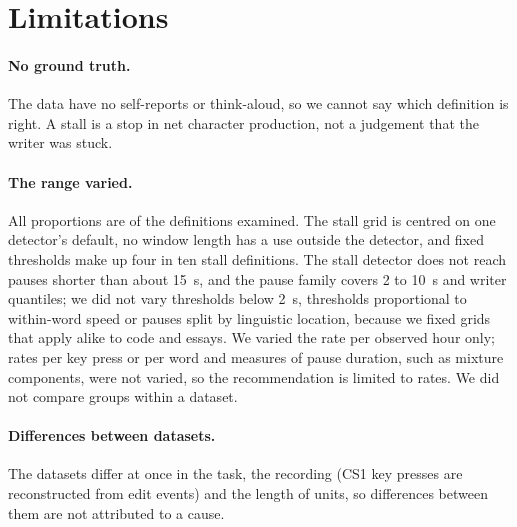 \section{Limitations}
\label{sec:limitations}

\paragraph{No ground truth.} The data have no self-reports or think-aloud, so we cannot say which definition is right.
A stall is a stop in net character production, not a judgement that the writer was stuck.

\paragraph{The range varied.} All proportions are of the definitions examined. The stall grid is centred on one
detector's default, no window length has a use outside the detector, and fixed thresholds make up four in ten stall definitions. The
stall detector does not reach pauses shorter than about 15~s, and the pause family covers 2 to 10~s and writer
quantiles; we did not vary thresholds below 2~s, thresholds proportional to within-word speed \cite{guo2020scenario}
or pauses split by linguistic location, because we fixed grids that apply alike to code and essays. We varied the rate per observed hour only; rates per key press or per
word and measures of pause duration, such as mixture components, were not varied, so the recommendation is limited to
rates. We did not compare groups within a dataset.

\paragraph{Differences between datasets.} The datasets differ at once in the task, the recording (CS1 key presses are
reconstructed from edit events) and the length of units, so differences between them are not attributed to a cause.

